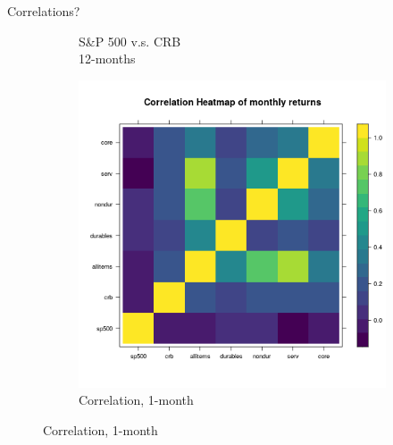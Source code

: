 \begin{frame}{Correlations?}
\begin{figure}[h!]
\begin{subfigure}{0.27\textwidth}
          \caption{S\&P 500 v.s. CRB\\ 12-months}
          \label{fig:sfig2}
        \end{subfigure}
        \begin{subfigure}{0.27\textwidth}
          \centering
          \includegraphics[width=\linewidth]{figures/heatmappce.png}
          \caption{Correlation, 1-month}
          \label{fig:sfig3}
        \end{subfigure}
        \label{fig:SP}
        \end{figure}
    \end{frame}